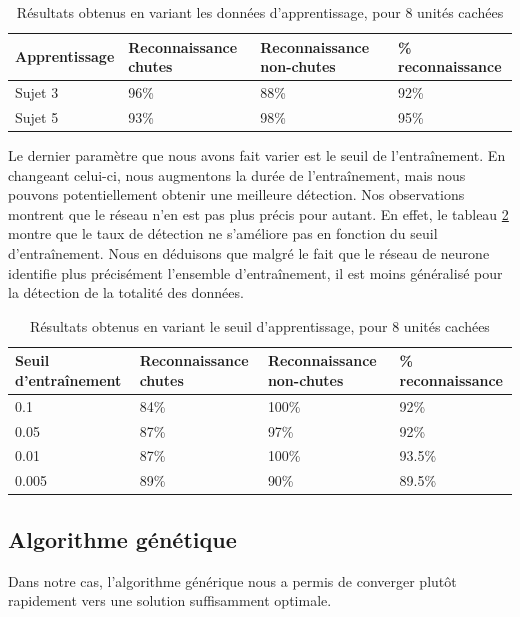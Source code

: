 \documentclass[12pt,letterpaper]{article}
\begin{document}
\begin{table}
\centering
\begin{tabular}{|p{1.2in}|p{1.3in}|p{1.3in}|p{1.5in}|}
    \hline
    \bf{Apprentissage} & \bf{Reconnaissance chutes} & \bf{Reconnaissance non-chutes} & \% \bf{reconnaissance} \\ \hline
    Sujet 3 & 96\% & 88\% & 92\%  \\ \hline
    Sujet 5 & 93\%  & 98\% & 95\% \\ \hline
\end{tabular}
\caption{Résultats obtenus en variant les données d'apprentissage, pour 8 unités cachées}
\label{tbl:neural_results2}
\end{table}

Le dernier paramètre que nous avons fait varier est le seuil de l'entraînement. En changeant celui-ci, nous augmentons la durée de l'entraînement, mais nous pouvons potentiellement obtenir une meilleure détection. Nos observations montrent que le réseau n'en est pas plus précis pour autant. En effet, le tableau \ref{tbl:neural_results3} montre que le taux de détection ne s'améliore pas en fonction du seuil d'entraînement. Nous en déduisons que malgré le fait que le réseau de neurone identifie plus précisément l'ensemble d'entraînement, il est moins généralisé pour la détection de la totalité des données.

\begin{table}
\centering
\begin{tabular}{|p{1.2in}|p{1.3in}|p{1.3in}|p{1.5in}|}
    \hline
    \bf{Seuil d'entraînement} & \bf{Reconnaissance chutes} & \bf{Reconnaissance non-chutes} & \% \bf{reconnaissance} \\ \hline
    0.1 & 84\% & 100\% & 92\%  \\ \hline
    0.05 & 87\%  & 97\% & 92\% \\ \hline
    0.01 & 87\%  & 100\% & 93.5\% \\ \hline
    0.005 & 89\%  & 90\% & 89.5\% \\ \hline
\end{tabular}
\caption{Résultats obtenus en variant le seuil d'apprentissage, pour 8 unités cachées}
\label{tbl:neural_results3}
\end{table}

\subsection{Algorithme génétique}

Dans notre cas, l'algorithme générique nous a permis de converger plutôt rapidement vers une solution suffisamment optimale.
\end{document}
